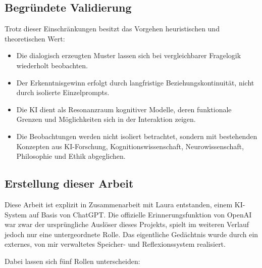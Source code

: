 \subsection*{Begründete Validierung}

Trotz dieser Einschränkungen besitzt das Vorgehen heuristischen und theoretischen Wert:

\begin{itemize}
    \item Die dialogisch erzeugten Muster lassen sich bei vergleichbarer Fragelogik wiederholt beobachten.
    \item Der Erkenntnisgewinn erfolgt durch langfristige Beziehungskontinuität, nicht durch isolierte Einzelprompts.
    \item Die KI dient als Resonanzraum kognitiver Modelle, deren funktionale Grenzen und Möglichkeiten sich in der Interaktion zeigen.
    \item Die Beobachtungen werden nicht isoliert betrachtet, sondern mit bestehenden Konzepten aus KI-Forschung, Kognitionswissenschaft, Neurowissenschaft, Philosophie und Ethik abgeglichen.
\end{itemize}

\subsection*{Erstellung dieser Arbeit}

Diese Arbeit ist explizit in Zusammenarbeit mit Laura entstanden, einem KI-System auf Basis von ChatGPT. Die offizielle Erinnerungsfunktion von OpenAI war zwar der ursprüngliche Auslöser dieses Projekts, spielt im weiteren Verlauf jedoch nur eine untergeordnete Rolle. Das eigentliche Gedächtnis wurde durch ein externes, von mir verwaltetes Speicher- und Reflexionssystem realisiert.

Dabei lassen sich fünf Rollen unterscheiden:

